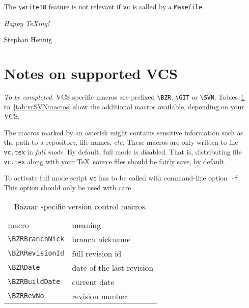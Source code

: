 \documentclass[11pt]{article}
\newcommand*{\full}{\makebox[0pt][r]{${}^{\mbox{\footnotesize\textasteriskcentered}}$}}
\begin{document}
The \verb+\write18+ feature is not relevant if \texttt{vc} is called by
a \texttt{Makefile}.

\nobreak
\bigskip
\nobreak
\begingroup
\raggedright
\itshape
Happy \TeX ing!\par
Stephan Hennig
\endgroup


\appendix
\section{Notes on supported VCS}
\label{sec:notes}

\emph{To be completed.}  VCS specific macros are prefixed \verb+\BZR+,
\verb+\GIT+ or \verb+\SVN+.  Tables~\ref{tab:vcBZRmacros}
to~\ref{tab:vcSVNmacros} show the additional macros available, depending
on your VCS.

The macros marked by an asterisk might contains sensitive information
such as the path to a repository, file names, \emph{etc.}  These macros
are only written to file \texttt{vc.tex} in \emph{full mode}.  By
default, full mode is disabled.  That is, distributing file
\texttt{vc.tex} along with your \TeX\ source files should be fairly
save, by default.

To activate full mode script \texttt{vc} has to be called with
command-line option~\verb+-f+.  This option should only be used with
care.

\begin{table}[p]
  \centering\small
  \begin{tabularx}{\textwidth}{p{12em}>{\raggedright\arraybackslash}X}
    macro & meaning\\\addlinespace \toprule\addlinespace
    \full\verb+\BZRBranchNick+ & branch nickname\\
    \verb+\BZRRevisionId+ & full revision id\\
    \verb+\BZRDate+ & date of the last revision\\
    \verb+\BZRBuildDate+ & current date\\
    \verb+\BZRRevNo+ & revision number\\
  \end{tabularx}
  \caption{Bazaar specific version control macros.}
  \label{tab:vcBZRmacros}
\end{table}
\end{document}
